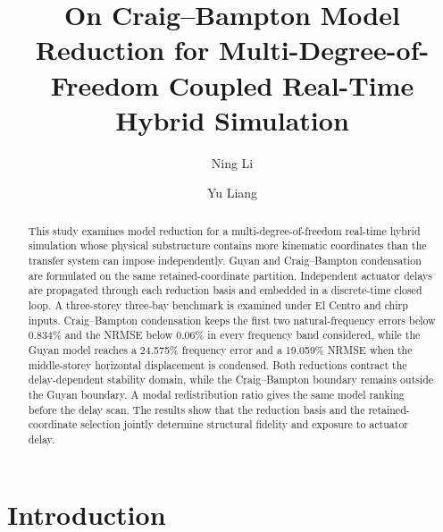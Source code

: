 \documentclass[a4paper,fleqn,review,12pt]{cas-sc}
\numberwithin{equation}{section}
\begin{document}
\let\WriteBookmarks\relax
\def\floatpagepagefraction{1}
\def\textpagefraction{.001}

\title[mode=title]{On Craig--Bampton Model Reduction for Multi-Degree-of-Freedom Coupled Real-Time Hybrid Simulation}

\author{Ning Li}
\author{Yu Liang}

\begin{abstract}
This study examines model reduction for a multi-degree-of-freedom real-time hybrid simulation whose physical substructure contains more kinematic coordinates than the transfer system can impose independently. Guyan and Craig--Bampton condensation are formulated on the same retained-coordinate partition. Independent actuator delays are propagated through each reduction basis and embedded in a discrete-time closed loop. A three-storey three-bay benchmark is examined under El Centro and chirp inputs. Craig--Bampton condensation keeps the first two natural-frequency errors below 0.834\% and the NRMSE below 0.06\% in every frequency band considered, while the Guyan model reaches a 24.575\% frequency error and a 19.059\% NRMSE when the middle-storey horizontal displacement is condensed. Both reductions contract the delay-dependent stability domain, while the Craig--Bampton boundary remains outside the Guyan boundary. A modal redistribution ratio gives the same model ranking before the delay scan. The results show that the reduction basis and the retained-coordinate selection jointly determine structural fidelity and exposure to actuator delay.
\end{abstract}


\maketitle
\linenumbers

\section{Introduction} \label{sec1}
\end{document}
